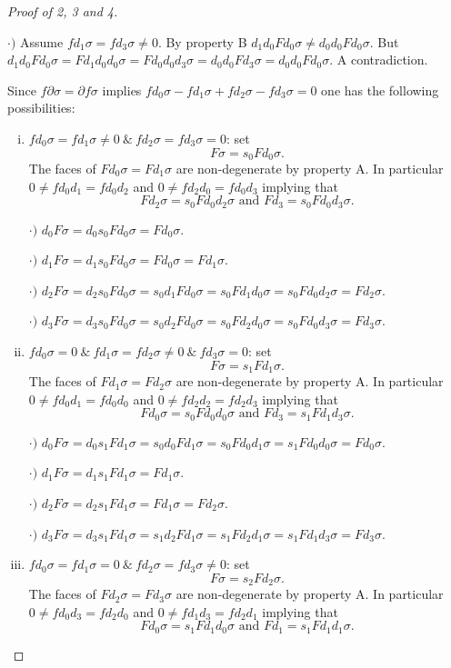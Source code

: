 \documentclass[main.tex]{subfiles}
\begin{document}
\begin{proof}[Proof of 2, 3 and 4]
\begin{enumerate}[a)]
    $\cdot)$ Assume $fd_1\sigma=fd_3\sigma\neq0$. By property B $d_1d_0Fd_0\sigma\neq d_0d_0Fd_0\sigma$. But $d_1d_0Fd_0\sigma=Fd_1d_0d_0\sigma=Fd_0d_0d_3\sigma=d_0d_0Fd_3\sigma=d_0d_0Fd_0\sigma$. A contradiction. \par

    Since $f\partial\sigma=\partial f\sigma$ implies $fd_0\sigma-fd_1\sigma+fd_2\sigma-fd_3\sigma=0$ one has the following possibilities:

        \begin{enumerate}[i)]

        \item \underline{$fd_0\sigma=fd_1\sigma\neq0\ \&\ fd_2\sigma=fd_3\sigma=0$}: set $$F\sigma=s_0Fd_0\sigma.$$
        The faces of $Fd_0\sigma=Fd_1\sigma$ are non-degenerate by property A. In particular $0\neq fd_0d_1=fd_0d_2$ and $0\neq fd_2d_0=fd_0d_3$ implying that $$Fd_2\sigma=s_0Fd_0d_2\sigma \text{ and } Fd_3=s_0Fd_0d_3\sigma.$$

        $\cdot)$ $d_0F\sigma=d_0s_0Fd_0\sigma=Fd_0\sigma$.

        $\cdot)$ $d_1F\sigma=d_1s_0Fd_0\sigma=Fd_0\sigma=Fd_1\sigma$.

        $\cdot)$ $d_2F\sigma=d_2s_0Fd_0\sigma=s_0d_1Fd_0\sigma=s_0Fd_1d_0\sigma=s_0Fd_0d_2\sigma=Fd_2\sigma$.

        $\cdot)$ $d_3F\sigma=d_3s_0Fd_0\sigma=s_0d_2Fd_0\sigma=s_0Fd_2d_0\sigma=s_0Fd_0d_3\sigma=Fd_3\sigma$.

        \item \underline{$fd_0\sigma=0\ \&\ fd_1\sigma=fd_2\sigma\neq0\ \&\ fd_3\sigma=0$}: set $$F\sigma=s_1Fd_1\sigma.$$
        The faces of $Fd_1\sigma=Fd_2\sigma$ are non-degenerate by property A. In particular $0\neq fd_0d_1=fd_0d_0$ and $0\neq fd_2d_2=fd_2d_3$ implying that $$Fd_0\sigma=s_0Fd_0d_0\sigma \text{ and } Fd_3=s_1Fd_1d_3\sigma.$$

        $\cdot)$ $d_0F\sigma=d_0s_1Fd_1\sigma=s_0d_0Fd_1\sigma=s_0Fd_0d_1\sigma=s_1Fd_0d_0\sigma=Fd_0\sigma$.

        $\cdot)$ $d_1F\sigma=d_1s_1Fd_1\sigma=Fd_1\sigma.$

        $\cdot)$ $d_2F\sigma=d_2s_1Fd_1\sigma=Fd_1\sigma=Fd_2\sigma$.

        $\cdot)$ $d_3F\sigma=d_3s_1Fd_1\sigma=s_1d_2Fd_1\sigma=s_1Fd_2d_1\sigma=s_1Fd_1d_3\sigma=Fd_3\sigma$.

        \item \underline{$fd_0\sigma=fd_1\sigma=0\ \&\ fd_2\sigma=fd_3\sigma\neq0$}: set $$F\sigma=s_2Fd_2\sigma.$$
        The faces of $Fd_2\sigma=Fd_3\sigma$ are non-degenerate by property A. In particular $0\neq fd_0d_3=fd_2d_0$ and $0\neq fd_1d_3=fd_2d_1$ implying that $$Fd_0\sigma=s_1Fd_1d_0\sigma\text{ and } Fd_1=s_1Fd_1d_1\sigma.$$


\end{enumerate}
\end{enumerate}
\end{proof}
\end{document}
